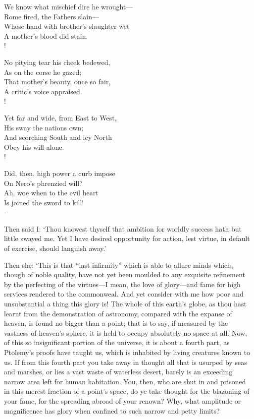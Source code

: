 \documentclass[12pt]{book}
\newenvironment{vpoem}[1]%
  {\def\poemvsindentlines{#1}\begin{poem}\small}%
  {\end{poem}\def\poemvsindentlines{\relax}}
\begin{document}
\begin{vpoem}{24}
    We know what mischief dire he wrought--- \\
      Rome fired, the Fathers slain--- \\
    Whose hand with brother's slaughter wet \\
      A mother's blood did stain. \\!

    No pitying tear his cheek bedewed, \\
      As on the corse he gazed; \\
    That mother's beauty, once so fair, \\
      A critic's voice appraised. \\!

    Yet far and wide, from East to West, \\
      His sway the nations own; \\
    And scorching South and icy North \\
      Obey his will alone. \\!

    Did, then, high power a curb impose \\
      On Nero's phrenzied will? \\
    Ah, woe when to the evil heart \\
      Is joined the sword to kill! \\-
\end{vpoem}


Then said I: `Thou knowest thyself that ambition for worldly success
hath but little swayed me. Yet I have desired opportunity for action,
lest virtue, in default of exercise, should languish away.'

Then she: `This is that ``last infirmity'' which is able to allure minds
which, though of noble quality, have not yet been moulded to any
exquisite refinement by the perfecting of the virtues---I mean, the love
of glory---and fame for high services rendered to the commonweal. And yet
consider with me how poor and unsubstantial a thing this glory is! The
whole of this earth's globe, as thou hast learnt from the demonstration
of astronomy, compared with the expanse of heaven, is found no bigger
than a point; that is to say, if measured by the vastness of heaven's
sphere, it is held to occupy absolutely no space at all. Now, of this so
insignificant portion of the universe, it is about a fourth part, as
Ptolemy's proofs have taught us, which is inhabited by living creatures
known to us. If from this fourth part you take away in thought all that
is usurped by seas and marshes, or lies a vast waste of waterless
desert, barely is an exceeding narrow area left for human habitation.
You, then, who are shut in and prisoned in this merest fraction of a
point's space, do ye take thought for the blazoning of your fame, for
the spreading abroad of your renown? Why, what amplitude or magnificence
has glory when confined to such narrow and petty limits?
\end{document}
